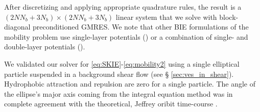 \documentclass[lineno]{jfm}
\newcommand{\xx}{\mathbf{x}}
\newcommand{\uu}{\mathbf{u}}
\begin{document}
After discretizing and applying appropriate quadrature rules, the result
is a $(2NN_b + 3N_b) \times (2NN_b + 3N_b)$ linear system that we solve
with block-diagonal preconditioned GMRES. We note that other BIE
formulations of the mobility problem use single-layer potentials
(\cite{cor-gre-rac-vee2017, rac-gre2016}) or a combination of single-
and double-layer potentials (\cite{cor-vee2018}).

We validated our solver for \eqref{eq:SKIE}-\eqref{eq:mobility2} using a
single elliptical particle suspended in a background shear flow (see \S
\ref{sec:ves_in_shear}). Hydrophobic attraction and repulsion are zero
for a single particle. The angle of the ellipse's major axis coming from
the integral equation method was in complete agreement with the
theoretical, Jeffrey oribit time-course \cite{}. 
  
% 


\end{document}
